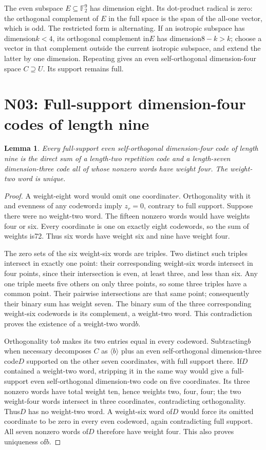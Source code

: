 \documentclass{article}
\newtheorem{lemma}{Lemma}
\begin{document}
The even subspace $E\subseteq\mathbb F_2^9$ has dimension eight.
Its dot-product radical is zero: the orthogonal complement of $E$
in the full space is the span of the all-one vector, which is odd.
The restricted form is alternating. If an isotropic subspace has
dimension$k<4$, its orthogonal complement in$E$ has dimension$8-k>k$;
choose a vector in that complement outside the current isotropic
subspace, and extend the latter by one dimension. Repeating gives an even self-orthogonal dimension-four
space $C\supseteq U$. Its support remains full.

\section{N03: Full-support dimension-four codes of length nine}
\begin{lemma}
Every full-support even self-orthogonal dimension-four code of length
nine is the direct sum of a length-two repetition code and a
length-seven dimension-three code all of whose nonzero words have
weight four. The weight-two word is unique.
\end{lemma}
\begin{proof}
A weight-eight word would omit one coordinate$r$. Orthogonality
with it and evenness of any codeword$z$ imply $z_r=0$, contrary to
full support. Suppose there were no weight-two word. The fifteen
nonzero words would have weights four or six. Every coordinate is
one on exactly eight codewords, so the sum of weights is72. Thus six
words have weight six and nine have weight four.

The zero sets of the six weight-six words are triples. Two distinct
such triples intersect in exactly one point: their corresponding
weight-six words intersect in four points, since their intersection
is even, at least three, and less than six. Any one triple meets five
others on only three points, so some three triples have a common
point. Their pairwise intersections are that same point; consequently
their binary sum has weight seven. The binary sum of the three
corresponding weight-six codewords is its complement, a weight-two
word. This contradiction proves the existence of a weight-two word$b$.

Orthogonality to$b$ makes its two entries equal in every codeword.
Subtracting$b$ when necessary decomposes $C$ as $\langle b\rangle$
plus an even self-orthogonal dimension-three code$D$ supported on the
other seven coordinates, with full support there. If$D$ contained a
weight-two word, stripping it in the same way would give a full-support
even self-orthogonal dimension-two code on five coordinates. Its three
nonzero words have total weight ten, hence weights two, four, four;
the two weight-four words intersect in three coordinates, contradicting
orthogonality. Thus$D$ has no weight-two word. A weight-six word of$D$
would force its omitted coordinate to be zero in every even codeword,
again contradicting full support. All seven nonzero words of$D$
therefore have weight four. This also proves uniqueness of$b$.
\end{proof}
\end{document}
